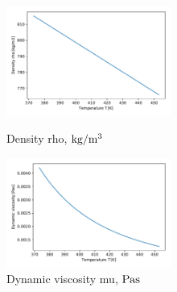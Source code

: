 \documentclass[conference]{IEEEtran}
\begin{document}
\begin{figure}[h]
\begin{minipage}{0.48\linewidth}
 \includegraphics[width=0.48\textwidth,natwidth=190,natheight=210]{fig/density_rho.pdf}
 \vspace{-1zh}
 \caption{Density rho, $\rm kg/m^{3}$}\label{density_rho}
\end{minipage}
\hfill
\begin{minipage}{0.48\linewidth}
 \includegraphics[width=0.48\textwidth,natwidth=190,natheight=210]{fig/dynamic_viscosity.pdf}
 \vspace{-1zh}
 \caption{Dynamic viscosity mu, $\rm Pa s$}\label{dynamic_viscosity}
\end{minipage}
\vspace{2zh}
\end{figure}
\end{document}
